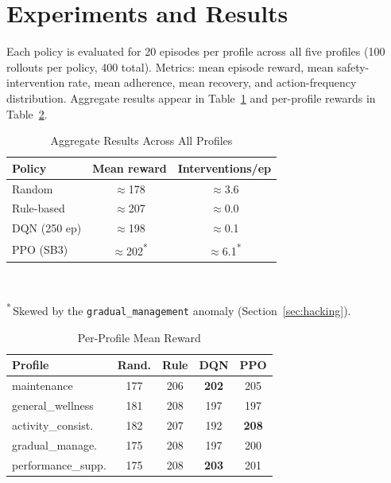 \documentclass[conference]{IEEEtran}
\newcommand{\code}[1]{\texttt{\small #1}}
\begin{document}
\section{Experiments and Results}
Each policy is evaluated for 20 episodes per profile across all five profiles
(100 rollouts per policy, 400 total). Metrics: mean episode reward, mean
safety-intervention rate, mean adherence, mean recovery, and action-frequency
distribution. Aggregate results appear in Table~\ref{tab:agg} and per-profile
rewards in Table~\ref{tab:perprofile}.

\begin{table}[!t]
\renewcommand{\arraystretch}{1.2}
\caption{Aggregate Results Across All Profiles}
\label{tab:agg}
\centering
\footnotesize
\begin{tabular}{@{}lcc@{}}
\toprule
\textbf{Policy} & \textbf{Mean reward} & \textbf{Interventions/ep} \\
\midrule
Random              & $\approx$178 & $\approx$3.6 \\
Rule-based          & $\approx$207 & $\approx$0.0 \\
DQN (250 ep)        & $\approx$198 & $\approx$0.1 \\
PPO (SB3)           & $\approx$202\textsuperscript{*} & $\approx$6.1\textsuperscript{*} \\
\bottomrule
\end{tabular}
\\[2pt]
\raggedright\textsuperscript{*}\,Skewed by the \code{gradual\_management}
anomaly (Section~\ref{sec:hacking}).
\end{table}

\begin{table}[!t]
\renewcommand{\arraystretch}{1.2}
\caption{Per-Profile Mean Reward}
\label{tab:perprofile}
\centering
\footnotesize
\begin{tabular}{@{}lcccc@{}}
\toprule
\textbf{Profile} & \textbf{Rand.} & \textbf{Rule} & \textbf{DQN} & \textbf{PPO} \\
\midrule
maintenance          & 177 & 206 & \textbf{202} & 205 \\
general\_wellness    & 181 & 208 & 197 & 197 \\
activity\_consist.   & 182 & 207 & 192 & \textbf{208} \\
gradual\_manage.     & 175 & 208 & 197 & 200 \\
performance\_supp.   & 175 & 208 & \textbf{203} & 201 \\
\bottomrule
\end{tabular}
\end{table}
\end{document}
